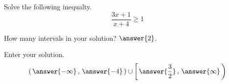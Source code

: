 \documentclass{ximera}
\begin{document}
\begin{exercise}

	Solve the following inequalty.
	\[ \dfrac{3x+1}{x+4} \geq 1 \]
	
	How many intervals in your solution?  $\answer{2}$.
	
	\begin{exercise}
		Enter your solution.
		\[ \left( \, \answer{-\infty} \, , \, \answer{-4} \, \right) \cup \left[\, \answer{\frac{3}{2}} \, , \, \answer{\infty} \, \right) \]
	\end{exercise}

\end{exercise}
\end{document}
